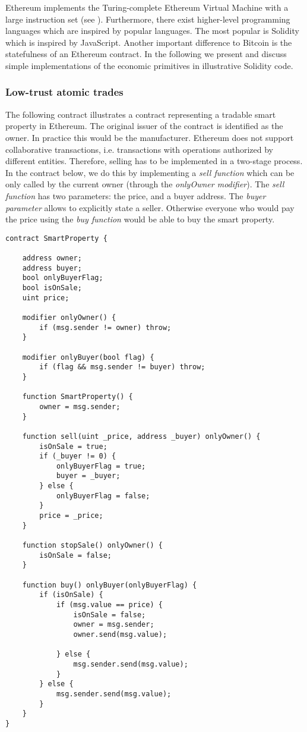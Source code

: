 Ethereum implements the Turing-complete Ethereum Virtual Machine with a large instruction set (see \cite{wood2014ethereum}). Furthermore, there exist higher-level programming languages which are inspired by popular languages. The most popular is Solidity which is inspired by JavaScript. Another important difference to Bitcoin is the statefulness of an Ethereum contract. In the following we present and discuss simple implementations of the economic primitives in illustrative Solidity code.


\subsubsection{Low-trust atomic trades}

The following contract illustrates a contract representing a tradable smart property in Ethereum. The original issuer of the contract is identified as the owner. In practice this would be the manufacturer. Ethereum does not support collaborative transactions, i.e. transactions with operations authorized by different entities. Therefore, selling has to be implemented in a two-stage process. In the contract below, we do this by implementing a \emph{sell function} which can be only called by the current owner (through the \emph{onlyOwner modifier}). The \emph{sell function} has two parameters: the price, and a buyer address. The \emph{buyer parameter} allows to explicitly state a seller. Otherwise everyone who would pay the price using the \emph{buy function} would be able to buy the smart property.

\newpage
\begin{lstlisting}[breaklines,basicstyle=\tiny]
contract SmartProperty {
    
    address owner;
    address buyer;
    bool onlyBuyerFlag;
    bool isOnSale;
    uint price;
    
    modifier onlyOwner() {
        if (msg.sender != owner) throw;
    }
    
    modifier onlyBuyer(bool flag) {
        if (flag && msg.sender != buyer) throw;
    }
    
    function SmartProperty() {
        owner = msg.sender;
    }
    
    function sell(uint _price, address _buyer) onlyOwner() {
        isOnSale = true;
        if (_buyer != 0) {
            onlyBuyerFlag = true;
            buyer = _buyer;
        } else {
            onlyBuyerFlag = false;
        }
        price = _price;
    }
    
    function stopSale() onlyOwner() {
        isOnSale = false;
    }
        
    function buy() onlyBuyer(onlyBuyerFlag) {
        if (isOnSale) {
            if (msg.value == price) {
                isOnSale = false;
                owner = msg.sender;
                owner.send(msg.value);
                
            } else {
                msg.sender.send(msg.value);
            }
        } else {
            msg.sender.send(msg.value);
        }
    }
}
\end{lstlisting}

